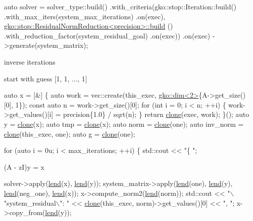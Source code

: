 \begin{DoxyCode}
\textcolor{keyword}{auto} solver =
    solver\_type::build()
        .with\_criteria(gko::stop::Iteration::build()
                           .with\_max\_iters(system\_max\_iterations)
                           .on(exec),
                       \hyperlink{classgko_1_1stop_1_1ResidualNormReduction}{gko::stop::ResidualNormReduction<precision>::build}
      ()
                           .with\_reduction\_factor(system\_residual\_goal)
                           .on(exec))
        .on(exec)
        ->generate(system\_matrix);
\end{DoxyCode}


inverse iterations

start with guess \mbox{[}1, 1, ..., 1\mbox{]}


\begin{DoxyCode}
\textcolor{keyword}{auto} x = [&] \{
    \textcolor{keyword}{auto} work = vec::create(this\_exec, \hyperlink{structgko_1_1dim}{gko::dim<2>}\{A->get\_size()[0], 1\});
    \textcolor{keyword}{const} \textcolor{keyword}{auto} n = work->get\_size()[0];
    \textcolor{keywordflow}{for} (\textcolor{keywordtype}{int} i = 0; i < n; ++i) \{
        work->get\_values()[i] = precision\{1.0\} / sqrt(n);
    \}
    \textcolor{keywordflow}{return} \hyperlink{namespacegko_a1beb80750459e4201aa9d882d2d074c3}{clone}(exec, work);
\}();
\textcolor{keyword}{auto} y = \hyperlink{namespacegko_a1beb80750459e4201aa9d882d2d074c3}{clone}(x);
\textcolor{keyword}{auto} tmp = \hyperlink{namespacegko_a1beb80750459e4201aa9d882d2d074c3}{clone}(x);
\textcolor{keyword}{auto} norm = \hyperlink{namespacegko_a1beb80750459e4201aa9d882d2d074c3}{clone}(one);
\textcolor{keyword}{auto} inv\_norm = \hyperlink{namespacegko_a1beb80750459e4201aa9d882d2d074c3}{clone}(this\_exec, one);
\textcolor{keyword}{auto} g = \hyperlink{namespacegko_a1beb80750459e4201aa9d882d2d074c3}{clone}(one);

\textcolor{keywordflow}{for} (\textcolor{keyword}{auto} i = 0u; i < max\_iterations; ++i) \{
    std::cout << \textcolor{stringliteral}{"\{ "};
\end{DoxyCode}


(A -\/ zI)y = x


\begin{DoxyCode}
solver->apply(\hyperlink{namespacegko_aa8cb4876b72e5e1036ea9575443c439b}{lend}(x), \hyperlink{namespacegko_aa8cb4876b72e5e1036ea9575443c439b}{lend}(y));
system\_matrix->apply(\hyperlink{namespacegko_aa8cb4876b72e5e1036ea9575443c439b}{lend}(one), \hyperlink{namespacegko_aa8cb4876b72e5e1036ea9575443c439b}{lend}(y), \hyperlink{namespacegko_aa8cb4876b72e5e1036ea9575443c439b}{lend}(neg\_one), \hyperlink{namespacegko_aa8cb4876b72e5e1036ea9575443c439b}{lend}(x));
x->compute\_norm2(\hyperlink{namespacegko_aa8cb4876b72e5e1036ea9575443c439b}{lend}(norm));
std::cout << \textcolor{stringliteral}{"\(\backslash\)"system\_residual\(\backslash\)": "}
          << \hyperlink{namespacegko_a1beb80750459e4201aa9d882d2d074c3}{clone}(this\_exec, norm)->get\_values()[0] << \textcolor{stringliteral}{", "};
x->copy\_from(\hyperlink{namespacegko_aa8cb4876b72e5e1036ea9575443c439b}{lend}(y));
\end{DoxyCode}


